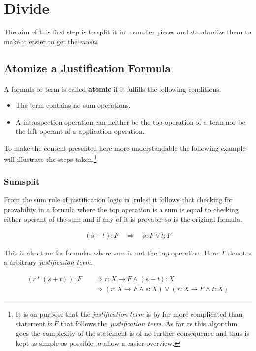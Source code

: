 \section{Divide}
The aim of this first step is to split it into smaller pieces and standardize them to make it easier to get the \emph{musts}.

\subsection{Atomize a Justification Formula}\label{chap:Algorithm.atomize}
\begin{definition}[atomic]
	A formula or term is called \textbf{atomic} if it fulfills the following conditions:
	\begin{itemize}
		\item The term contains no sum operations.
		\item A introspection operation can neither be the top operation of a term nor be the left operant of a application operation.
	\end{itemize}	
\end{definition}
To make the content presented here more understandable the following example will illustrate the steps taken.\footnote{It is on purpose that the \emph{justification term} is by far more complicated than statement $b:F$ that follows the \emph{justification term}. As far as this algorithm goes the complexity of the statement is of no further consequence and thus is kept as simple as possible to allow a easier overview.}

\subsubsection{Sumsplit}
\label{sumsplit}
From the sum rule of justification logic in \ref{rules} it follows that checking for provability in a formula where the top operation is a sum is equal to checking either operant of the sum and if any of it is provable so is the original formula.

\begin{align}\label{ss1}
	(s+t):F \quad \Rightarrow \quad s:F \lor t:F
\end{align}



This is also true for formulas where sum is not the top operation. Here $X$ denotes a arbitrary \emph{justification term}.

\begin{align}\label{ss2}
	(r*(s+t)):F  \quad & \Rightarrow r: X \rightarrow F \land (s+t): X \\
	& \Rightarrow ( r: X \rightarrow F \land s: X ) \lor ( r: X \rightarrow F \land t: X )
\end{align}

